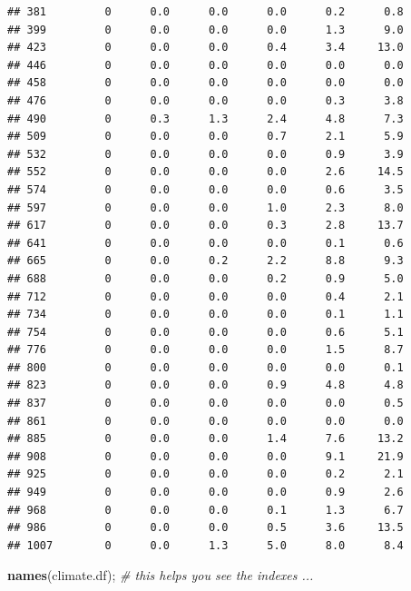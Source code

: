 \documentclass[
]{article}
\newenvironment{Shaded}{\begin{snugshade}}{\end{snugshade}}
\newcommand{\CommentTok}[1]{\textcolor[rgb]{0.56,0.35,0.01}{\textit{#1}}}
\newcommand{\KeywordTok}[1]{\textcolor[rgb]{0.13,0.29,0.53}{\textbf{#1}}}
\newcommand{\NormalTok}[1]{#1}
\begin{document}
\begin{verbatim}
## 381         0      0.0      0.0      0.0      0.2      0.8
## 399         0      0.0      0.0      0.0      1.3      9.0
## 423         0      0.0      0.0      0.4      3.4     13.0
## 446         0      0.0      0.0      0.0      0.0      0.0
## 458         0      0.0      0.0      0.0      0.0      0.0
## 476         0      0.0      0.0      0.0      0.3      3.8
## 490         0      0.3      1.3      2.4      4.8      7.3
## 509         0      0.0      0.0      0.7      2.1      5.9
## 532         0      0.0      0.0      0.0      0.9      3.9
## 552         0      0.0      0.0      0.0      2.6     14.5
## 574         0      0.0      0.0      0.0      0.6      3.5
## 597         0      0.0      0.0      1.0      2.3      8.0
## 617         0      0.0      0.0      0.3      2.8     13.7
## 641         0      0.0      0.0      0.0      0.1      0.6
## 665         0      0.0      0.2      2.2      8.8      9.3
## 688         0      0.0      0.0      0.2      0.9      5.0
## 712         0      0.0      0.0      0.0      0.4      2.1
## 734         0      0.0      0.0      0.0      0.1      1.1
## 754         0      0.0      0.0      0.0      0.6      5.1
## 776         0      0.0      0.0      0.0      1.5      8.7
## 800         0      0.0      0.0      0.0      0.0      0.1
## 823         0      0.0      0.0      0.9      4.8      4.8
## 837         0      0.0      0.0      0.0      0.0      0.5
## 861         0      0.0      0.0      0.0      0.0      0.0
## 885         0      0.0      0.0      1.4      7.6     13.2
## 908         0      0.0      0.0      0.0      9.1     21.9
## 925         0      0.0      0.0      0.0      0.2      2.1
## 949         0      0.0      0.0      0.0      0.9      2.6
## 968         0      0.0      0.0      0.1      1.3      6.7
## 986         0      0.0      0.0      0.5      3.6     13.5
## 1007        0      0.0      1.3      5.0      8.0      8.4
\end{verbatim}

\begin{Shaded}
\begin{Highlighting}[]
\KeywordTok{names}\NormalTok{(climate.df); }\CommentTok{\# this helps you see the indexes ...}
\end{Highlighting}
\end{Shaded}
\end{document}
